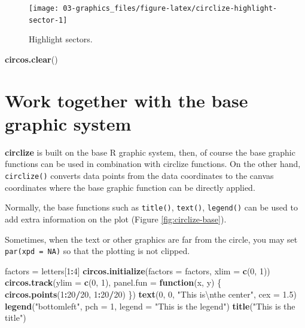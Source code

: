 \documentclass[]{book}
\newenvironment{Shaded}{\begin{snugshade}}{\end{snugshade}}
\newcommand{\KeywordTok}[1]{\textcolor[rgb]{0.13,0.29,0.53}{\textbf{#1}}}
\newcommand{\DataTypeTok}[1]{\textcolor[rgb]{0.13,0.29,0.53}{#1}}
\newcommand{\DecValTok}[1]{\textcolor[rgb]{0.00,0.00,0.81}{#1}}
\newcommand{\FloatTok}[1]{\textcolor[rgb]{0.00,0.00,0.81}{#1}}
\newcommand{\CharTok}[1]{\textcolor[rgb]{0.31,0.60,0.02}{#1}}
\newcommand{\StringTok}[1]{\textcolor[rgb]{0.31,0.60,0.02}{#1}}
\newcommand{\ControlFlowTok}[1]{\textcolor[rgb]{0.13,0.29,0.53}{\textbf{#1}}}
\newcommand{\OperatorTok}[1]{\textcolor[rgb]{0.81,0.36,0.00}{\textbf{#1}}}
\newcommand{\NormalTok}[1]{#1}
\theoremstyle{definition}
\theoremstyle{definition}
\theoremstyle{remark}
\begin{document}
\begin{figure}

{\centering \texttt{[image: 03-graphics\_files/figure-latex/circlize-highlight-sector-1]} 

}

\caption{Highlight sectors.}\label{fig:circlize-highlight-sector}
\end{figure}

\begin{Shaded}
\begin{Highlighting}[]
\KeywordTok{circos.clear}\NormalTok{()}
\end{Highlighting}
\end{Shaded}

\section{Work together with the base graphic
system}\label{work-with-base-graphic-system}

\textbf{circlize} is built on the base R graphic system, then, of course
the base graphic functions can be used in combination with circlize
functions. On the other hand, \texttt{circlize()} converts data points
from the data coordinates to the canvas coordinates where the base
graphic function can be directly applied.

Normally, the base functions such as \texttt{title()}, \texttt{text()},
\texttt{legend()} can be used to add extra information on the plot
(Figure \ref{fig:circlize-base}).

Sometimes, when the text or other graphics are far from the circle, you
may set \texttt{par(xpd\ =\ NA)} so that the plotting is not clipped.

\begin{Shaded}
\begin{Highlighting}[]
\NormalTok{factors =}\StringTok{ }\NormalTok{letters[}\DecValTok{1}\OperatorTok{:}\DecValTok{4}\NormalTok{]}
\KeywordTok{circos.initialize}\NormalTok{(}\DataTypeTok{factors =}\NormalTok{ factors, }\DataTypeTok{xlim =} \KeywordTok{c}\NormalTok{(}\DecValTok{0}\NormalTok{, }\DecValTok{1}\NormalTok{))}
\KeywordTok{circos.track}\NormalTok{(}\DataTypeTok{ylim =} \KeywordTok{c}\NormalTok{(}\DecValTok{0}\NormalTok{, }\DecValTok{1}\NormalTok{), }\DataTypeTok{panel.fun =} \ControlFlowTok{function}\NormalTok{(x, y) \{}
    \KeywordTok{circos.points}\NormalTok{(}\DecValTok{1}\OperatorTok{:}\DecValTok{20}\OperatorTok{/}\DecValTok{20}\NormalTok{, }\DecValTok{1}\OperatorTok{:}\DecValTok{20}\OperatorTok{/}\DecValTok{20}\NormalTok{)}
\NormalTok{\})}
\KeywordTok{text}\NormalTok{(}\DecValTok{0}\NormalTok{, }\DecValTok{0}\NormalTok{, }\StringTok{"This is}\CharTok{\textbackslash{}n}\StringTok{the center"}\NormalTok{, }\DataTypeTok{cex =} \FloatTok{1.5}\NormalTok{)}
\KeywordTok{legend}\NormalTok{(}\StringTok{"bottomleft"}\NormalTok{, }\DataTypeTok{pch =} \DecValTok{1}\NormalTok{, }\DataTypeTok{legend =} \StringTok{"This is the legend"}\NormalTok{)}
\KeywordTok{title}\NormalTok{(}\StringTok{"This is the title"}\NormalTok{)}
\end{Highlighting}
\end{Shaded}
\end{document}
